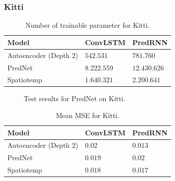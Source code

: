   \subsubsection{Kitti}
   \begin{table}[H]
    \begin{center}
     \begin{tabular}{| l | l | l |}\hline
      \textbf{Model} & \textbf{ConvLSTM} & \textbf{PredRNN} \\\hline
      Autoencoder (Depth $2$) & $542.531$ & $781.760$ \\\hline
      PredNet & $8.222.559$ & $12.430.626$ \\\hline
      Spatiotemp & $1.640.321$ & $2.200.641$ \\\hline
     \end{tabular}
    \end{center}
    \caption{Number of trainable parameter for Kitti.}
   \end{table}\noindent
   \begin{figure}[H]
   \centering
   \qquad
   \qquad
   \caption{Test results for PredNet on Kitti.}
   \label{figure::prednet_kth_results}
  \end{figure}\noindent
   \begin{table}[H]
    \begin{center}
     \begin{tabular}{| l | l | l |}\hline
      \textbf{Model} & \textbf{ConvLSTM} & \textbf{PredRNN} \\\hline
      Autoencoder (Depth $2$) & $0.02$ & $0.013$ \\\hline
      PredNet & $0.019$ & $0.02$ \\\hline
      Spatiotemp & $0.018$ & $0.017$ \\\hline
     \end{tabular}
    \end{center}
    \caption{Mean MSE for Kitti.}
   \end{table}\noindent
